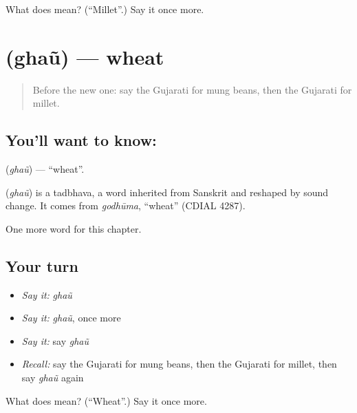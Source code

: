 \begin{tcolorbox}[breakable,colback=teal!4,colframe=teal!35!black,title={Before you move on}]
What does  mean? (\textquotedblleft{}Millet\textquotedblright{}.) Say it once more.
\end{tcolorbox}
\section[\texorpdfstring{\gu{ઘઉં} (ghaũ)}{ઘઉં (ghaũ)}]{ (ghaũ) — wheat}

\label{lesson:GU-C114-ghau}



\begin{quote}
Before the new one: say the Gujarati for mung beans, then the Gujarati for millet.
\end{quote}

\subsection*{You'll want to know: }
\textbf{} (\emph{ghaũ}) — \textquotedblleft{}wheat\textquotedblright{}.

\begin{cousinweb}
\textbf{} (\emph{ghaũ}) is a tadbhava, a word inherited from Sanskrit and reshaped by sound change. It comes from \emph{godhūma}, \textquotedblleft{}wheat\textquotedblright{} (CDIAL 4287).
\end{cousinweb}

\begin{grammarlens}[title={What you've built}]
One more word for this chapter.
\end{grammarlens}

\subsection*{Your turn}
\begin{itemize}
\raggedright
  \item \emph{Say it:} \emph{ghaũ}
  \item \emph{Say it:} \emph{ghaũ}, once more
  \item \emph{Say it:} say \emph{ghaũ}
  \item \emph{Recall:} say the Gujarati for mung beans, then the Gujarati for millet, then say \emph{ghaũ} again
\end{itemize}

\begin{tcolorbox}[breakable,colback=teal!4,colframe=teal!35!black,title={Before you move on}]
What does  mean? (\textquotedblleft{}Wheat\textquotedblright{}.) Say it once more.
\end{tcolorbox}
